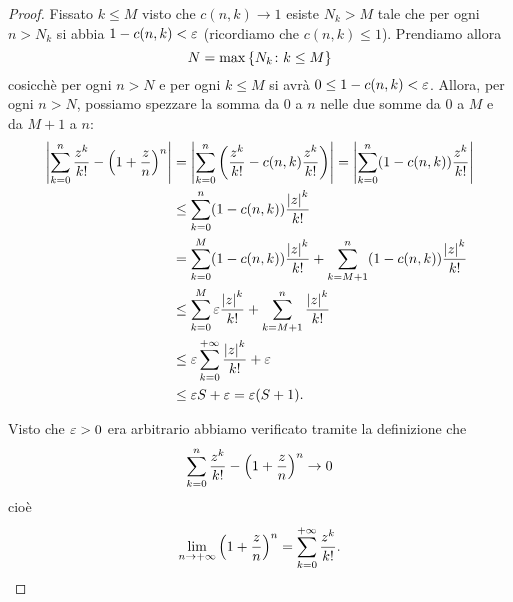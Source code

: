 \begin{proof}
Fissato $k\le M$ visto che $c(n,k)\to 1$
esiste $N_k > M$ tale che per ogni $n>N_k$
si abbia $1-c(n,k) < \varepsilon$
(ricordiamo che $c(n,k)\le 1$).
Prendiamo allora
\[
  N=\max{\left\{ N_k\colon k\le M \right\}}
\]
cosicchè per ogni $n>N$ e per ogni $k\le M$ si avrà $0 \le 1-c(n,k) < \varepsilon$.
Allora, per ogni $n>N$, possiamo spezzare la somma da $0$ a $n$ nelle due
somme da $0$ a $M$ e da $M+1$ a $n$:
\begin{align*}
{\left|\sum_{k=0}^n \frac{z^k}{k!} - {\left( 1+\frac z n \right)}^n\right|}
&= {\left|\sum_{k=0}^n {\left( \frac{z^k}{k!} - c(n,k)\frac{z^k}{k!} \right)}\right|}
= {\left|\sum_{k=0}^n  (1-c(n,k))\frac{z^k}{k!}\right|} \\
&\le \sum_{k=0}^n  (1-c(n,k))\frac{{\left|z\right|}^k}{k!} \\
  &= \sum_{k=0}^{M} (1-c(n,k)) \frac{{\left|z\right|}^k}{k!}
   + \sum_{k=M+1}^n (1-c(n,k)) \frac{{\left|z\right|}^k}{k!} \\
&\le \sum_{k=0}^{M} \varepsilon \frac{{\left|z\right|}^k}{k!}
   + \sum_{k=M+1}^n \frac{{\left|z\right|}^k}{k!} \\
&\le  \varepsilon \sum_{k=0}^{+\infty} \frac{{\left|z\right|}^k}{k!}
    + \varepsilon \\
&\le \varepsilon S + \varepsilon
= \varepsilon (S+1).
\end{align*}

Visto che $\varepsilon>0$ era arbitrario abbiamo verificato
tramite la definizione che
\[
\sum_{k=0}^n \frac{z^k}{k!} - {\left( 1+\frac z n \right)}^n \to 0
\]
cioè
\[
\lim_{n\to +\infty} {\left( 1+\frac z n \right)}^n = \sum_{k=0}^{+\infty} \frac{z^k}{k!}.
\]
\end{proof}

